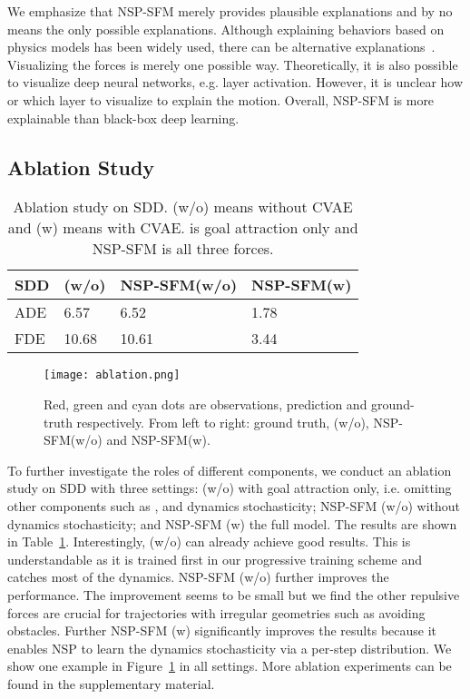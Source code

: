\documentclass[runningheads]{llncs}
\newcommand{\Figref}[1]{Figure~\ref{fig:#1}}
\newcommand{\Tabref}[1]{Table~\ref{tab:#1}}
\begin{document}
We emphasize that NSP-SFM merely provides plausible explanations and by no means the only possible explanations. Although explaining behaviors based on physics models has been widely used, there can be alternative explanations~\cite{wang2016understanding}. Visualizing the forces is merely one possible way. Theoretically, it is also possible to visualize deep neural networks, e.g. layer activation. However, it is unclear how or which layer to visualize to explain the motion.  Overall, NSP-SFM is more explainable than black-box deep learning. 

\subsection{Ablation Study}

\begin{table}[tb]
\begin{center}
\caption{Ablation study on SDD. (w/o) means without CVAE and (w) means with CVAE.  is goal attraction only and NSP-SFM is all three forces.}
\begin{tabular}{ |p{1.2cm}||p{2cm}|p{2.5cm}|p{2cm}| }
 \hline
 SDD & (w/o) & NSP-SFM(w/o) & NSP-SFM(w)\\
 \hline
 ADE & 6.57 & 6.52 & 1.78\\
 FDE & 10.68 & 10.61 & 3.44\\
 \hline
\end{tabular}
\label{tab:ablation}
\end{center}
\end{table}

\begin{figure}[tb]
\centering
\texttt{[image: ablation.png]}
\caption{Red, green and cyan dots are observations, prediction and ground-truth respectively. From left to right: ground truth, (w/o), NSP-SFM(w/o) and NSP-SFM(w).}
\label{fig:ablation}
\end{figure}



To further investigate the roles of different components, we conduct an ablation study on SDD with three settings: (w/o) with goal attraction only, i.e. omitting other components such as ,  and dynamics stochasticity; NSP-SFM (w/o) without dynamics stochasticity; and NSP-SFM (w) the full model. The results are shown in \Tabref{ablation}. Interestingly, (w/o) can already achieve good results. This is understandable as it is trained first in our progressive training scheme and catches most of the dynamics. NSP-SFM (w/o) further improves the performance. The improvement seems to be small but we find the other repulsive forces are crucial for trajectories with irregular geometries such as avoiding obstacles. Further NSP-SFM (w) significantly improves the results because it enables NSP to learn the dynamics stochasticity via a per-step distribution. We show one example in \Figref{ablation} in all settings. More ablation experiments can be found in the supplementary material.
\end{document}
